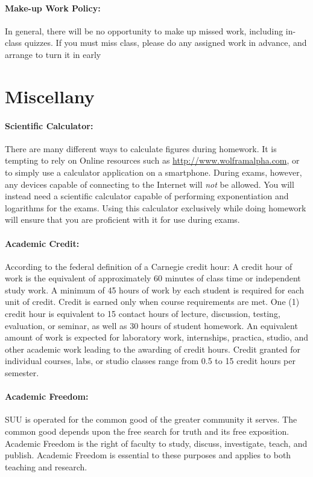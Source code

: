 \documentclass[12pt, letterpaper]{article}
\begin{document}
\paragraph{Make-up Work Policy:}
In general, there will be no opportunity to make up missed work, including in-class quizzes. If you must miss class, please do any assigned work in advance, and arrange to turn it in early

\section*{Miscellany}

\paragraph{Scientific Calculator:}
There are many different ways to calculate figures during homework. It is tempting to rely on Online resources such as \href{http://www.wolframalpha.com}{http://www.wolframalpha.com}, or to simply use a calculator application on a smartphone. During exams, however, any devices capable of connecting to the Internet will \emph{not} be allowed. You will instead need a scientific calculator capable of performing exponentiation and logarithms for the exams. Using this calculator exclusively while doing homework will ensure that you are proficient with it for use during exams.

\paragraph{Academic Credit:}
According to the federal definition of a Carnegie credit hour: A credit hour of work is the equivalent of approximately 60 minutes of class time or independent study work. A minimum of 45 hours of work by each student is required for each unit of credit. Credit is earned only when course requirements are met. One (1) credit hour is equivalent to 15 contact hours of lecture, discussion, testing, evaluation, or seminar, as well as 30 hours of student homework. An equivalent amount of work is expected for laboratory work, internships, practica, studio, and other academic work leading to the awarding of credit hours. Credit granted for individual courses, labs, or studio classes range from 0.5 to 15 credit hours per semester.

\paragraph{Academic Freedom:}
SUU is operated for the common good of the greater community it serves. The common good depends upon the free search for truth and its free exposition. Academic Freedom is the right of faculty to study, discuss, investigate, teach, and publish. Academic Freedom is essential to these purposes and applies to both teaching and research. 
\end{document}
